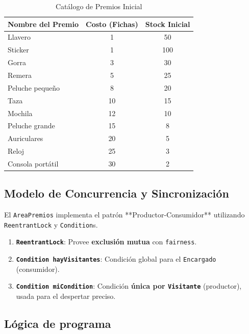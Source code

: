 \documentclass[12pt,a4paper]{article}
\begin{document}
\begin{table}[H]
    \centering
    \caption{Catálogo de Premios Inicial}
    \begin{tabular}{|l|c|c|}
        \hline
        \textbf{Nombre del Premio} & \textbf{Costo (Fichas)} & \textbf{Stock Inicial} \\
        \hline
        Llavero & 1 & 50 \\
        Sticker & 1 & 100 \\
        Gorra & 3 & 30 \\
        Remera & 5 & 25 \\
        Peluche pequeño & 8 & 20 \\
        Taza & 10 & 15 \\
        Mochila & 12 & 10 \\
        Peluche grande & 15 & 8 \\
        Auriculares & 20 & 5 \\
        Reloj & 25 & 3 \\
        Consola portátil & 30 & 2 \\
        \hline
    \end{tabular}
\end{table}

\subsection{Modelo de Concurrencia y Sincronización}

El \texttt{AreaPremios} implementa el patrón **Productor-Consumidor** utilizando \texttt{ReentrantLock} y \texttt{Condition}s.

\begin{enumerate}
    \item \textbf{\texttt{ReentrantLock}}: Provee \textbf{exclusión mutua} con \texttt{fairness}.
    \item \textbf{\texttt{Condition hayVisitantes}}: Condición global para el \texttt{Encargado} (consumidor).
    \item \textbf{\texttt{Condition miCondition}}: Condición \textbf{única por \texttt{Visitante}} (productor), usada para el despertar preciso.
\end{enumerate}



\subsection{Lógica de programa}
\end{document}
